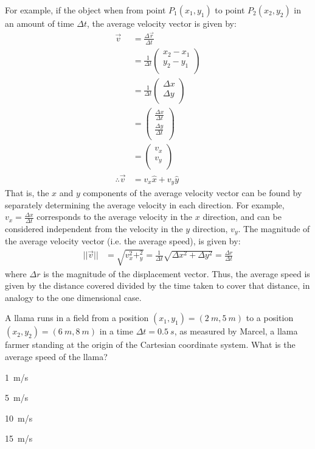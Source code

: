 For example, if the object when from point $P_1(x_1,y_1)$ to point $P_2(x_2,y_2)$ in an amount of time $\Delta t$, the average velocity vector is given by:
\begin{align*}
\vec v &= \frac{\Delta \vec r}{\Delta t}\\
&=\frac{1}{\Delta t}\begin{pmatrix}
           x_2-x_1 \\
           y_2-y_1 \\
         \end{pmatrix}\\
 &=\frac{1}{\Delta t}\begin{pmatrix}
           \Delta x \\
           \Delta y \\
         \end{pmatrix}\\     
 &=\begin{pmatrix}
           \frac{\Delta x}{\Delta t} \\
           \frac{\Delta y}{\Delta t}\\
         \end{pmatrix}\\       
 &=\begin{pmatrix}
           v_x \\
           v_y \\
         \end{pmatrix}\\    
\therefore \vec v &= v_x\hat x+v_y\hat y                     
\end{align*}
That is, the $x$ and $y$ components of the average velocity vector can be found by separately determining the average velocity in each direction. For example, $v_x=\frac{\Delta x}{\Delta t}$ corresponds to the average velocity in the $x$ direction, and can be considered independent from the velocity in the $y$ direction, $v_y$. The magnitude of the average velocity vector (i.e. the average speed), is given by:
\begin{align*}
||\vec v||&=\sqrt{v_x^2+_y^2}=\frac{1}{\Delta t}\sqrt{\Delta x^2+\Delta y^2}=\frac{\Delta r}{\Delta t}
\end{align*}
where $\Delta r$ is the magnitude of the displacement vector. Thus, the average speed is given by the distance covered divided by the time taken to cover that distance, in analogy to the one dimensional case.

\begin{checkpointMC}{A llama runs in a field from a position $(x_1,y_1)=(\SI{2}{m},\SI{5}{m})$ to a position $(x_2,y_2)=(\SI{6}{m},\SI{8}{m})$ in a time $\Delta t=\SI{0.5}{s}$, as measured by Marcel, a llama farmer standing at the origin of the Cartesian coordinate system. What is the average speed of the llama?}
\item \SI{1}{m/s}
\item \SI{5}{m/s}
\item \SI{10}{m/s}%
\item \SI{15}{m/s}
\end{checkpointMC}


